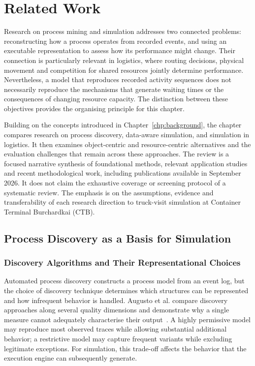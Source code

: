 \chapter{Related Work}
\label{chp:related_work}

Research on process mining and simulation addresses two connected problems: reconstructing how a process operates from recorded events, and using an executable representation to assess how its performance might change. Their connection is particularly relevant in logistics, where routing decisions, physical movement and competition for shared resources jointly determine performance. Nevertheless, a model that reproduces recorded activity sequences does not necessarily reproduce the mechanisms that generate waiting times or the consequences of changing resource capacity. The distinction between these objectives provides the organising principle for this chapter.

Building on the concepts introduced in Chapter~\ref{chp:background}, the chapter compares research on process discovery, data-aware simulation, and simulation in logistics. It then examines object-centric and resource-centric alternatives and the evaluation challenges that remain across these approaches. The review is a focused narrative synthesis of foundational methods, relevant application studies and recent methodological work, including publications available in September 2026. It does not claim the exhaustive coverage or screening protocol of a systematic review. The emphasis is on the assumptions, evidence and transferability of each research direction to truck-visit simulation at Container Terminal Burchardkai (CTB).

\section{Process Discovery as a Basis for Simulation}
\label{sec:rw_discovery}

\subsection{Discovery Algorithms and Their Representational Choices}

Automated process discovery constructs a process model from an event log, but the choice of discovery technique determines which structures can be represented and how infrequent behavior is handled. Augusto et al. compare discovery approaches along several quality dimensions and demonstrate why a single measure cannot adequately characterise their output~\cite{RWAugusto2019Review}. A highly permissive model may reproduce most observed traces while allowing substantial additional behavior; a restrictive model may capture frequent variants while excluding legitimate exceptions. For simulation, this trade-off affects the behavior that the execution engine can subsequently generate.

